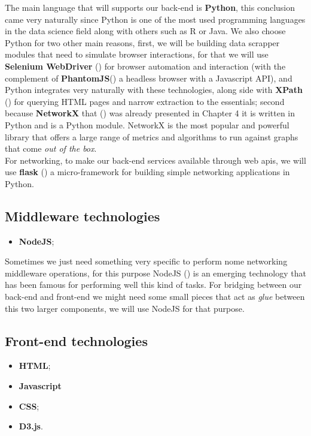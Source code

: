 The main language that will supports our back-end is \textbf{Python}, this conclusion came very naturally since Python is one of the most used programming languages in the data science field along with others such as R or Java. We also choose Python for two other main reasons, first, we will be building data scrapper modules that need to simulate browser interactions, for that we will use \textbf{Selenium WebDriver} (\cite{documentation2013selenium}) for browser automation and interaction (with the complement of \textbf{PhantomJS}(\cite{hidayat2013phantomjs}) a headless browser with a Javascript API), and Python integrates very naturally with these technologies, along side with \textbf{XPath} (\cite{clark1999xml}) for querying HTML pages and narrow extraction to the essentials; second because \textbf{NetworkX} that (\cite{hagberg2013networkx}) was already presented in Chapter 4 it is written in Python and is a Python module. NetworkX is the most popular and powerful library that offers a large range of metrics and algorithms to run against graphs that come \textit{out of the box}.\\
\indent For networking, to make our back-end services available through web \glspl{api}, we will use \textbf{flask} (\cite{ronacher2015flask}) a micro-framework for building simple networking applications in Python.

\subsection{Middleware technologies}
\begin{itemize}
    \item \textbf{NodeJS};
\end{itemize}

Sometimes we just need something very specific to perform nome networking middleware operations, for this purpose NodeJS (\cite{nodejs}) is an emerging technology
that has been famous for performing well this kind of tasks. For bridging between our back-end and front-end we might need some small pieces that act
as \textit{glue} between this two larger components, we will use NodeJS for that purpose.

\subsection{Front-end technologies}
\begin{itemize}
    \item \textbf{HTML};
    \item \textbf{Javascript}
    \item \textbf{CSS};
    \item \textbf{D3.js}.
\end{itemize}


